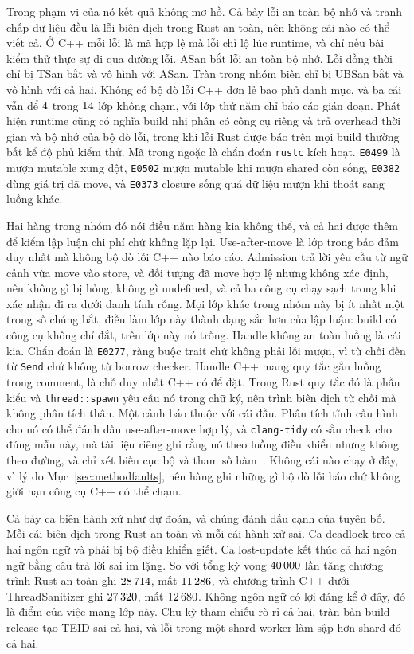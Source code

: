 Trong phạm vi của nó kết quả không mơ hồ. Cả bảy
lỗi an toàn bộ nhớ và tranh chấp dữ liệu đều là lỗi biên dịch trong Rust an toàn, nên không cái nào có thể
viết cả. Ở C++ mỗi lỗi là mã hợp lệ mà lỗi chỉ lộ lúc runtime, và
chỉ nếu bài kiểm thử thực sự đi qua đường lỗi. ASan bắt lỗi an toàn bộ nhớ. Lỗi
đồng thời chỉ bị TSan bắt và vô hình với ASan. Tràn trong
nhóm biên chỉ bị UBSan bắt và vô hình với cả hai. Không có bộ dò lỗi C++ đơn lẻ bao phủ
danh mục, và ba cái vẫn để $4$ trong
$14$ lớp không chạm, với lớp thứ năm chỉ báo cáo gián đoạn.
Phát hiện runtime cũng có nghĩa build nhị phân có công cụ riêng và trả overhead thời gian và bộ nhớ của bộ dò lỗi, trong khi
lỗi Rust được báo trên mọi build thường bất kể độ phủ kiểm thử. Mã
trong ngoặc là chẩn đoán \texttt{rustc} kích hoạt. \texttt{E0499} là mượn mutable
xung đột, \texttt{E0502} mượn mutable khi mượn shared còn sống, \texttt{E0382} dùng giá trị
đã move, và \texttt{E0373} closure sống quá dữ liệu mượn khi thoát sang luồng
khác.

Hai hàng trong nhóm đó nói điều năm hàng kia không thể, và cả hai được thêm để kiểm
lập luận chi phí chứ không lặp lại. Use-after-move là lớp trong bảo đảm duy nhất mà
không bộ dò lỗi C++ nào báo cáo. Admission trả lời yêu cầu từ ngữ cảnh vừa move
vào store, và đối tượng đã move hợp lệ nhưng không xác định, nên không gì bị hỏng,
không gì undefined, và cả ba công cụ chạy sạch trong khi xác nhận đi ra dưới
danh tính rỗng. Mọi lớp khác trong nhóm này bị ít nhất một trong số chúng bắt, điều
làm lớp này thành dạng sắc hơn của lập luận: build có công cụ không chỉ
đắt, trên lớp này nó trống. Handle không an toàn luồng là cái kia. Chẩn đoán là
\texttt{E0277}, ràng buộc trait chứ không phải lỗi mượn, vì từ chối đến từ
\texttt{Send} chứ không từ borrow checker. Handle C++ mang quy tắc gắn luồng
trong comment, là chỗ duy nhất C++ có để đặt. Trong Rust quy tắc đó là phần
kiểu và \texttt{thread::spawn} yêu cầu nó trong chữ ký, nên trình biên dịch từ chối mà không
phân tích thân. Một cảnh báo thuộc với cái đầu. Phân tích tĩnh
cấu hình cho nó có thể đánh dấu use-after-move hợp lý, và \texttt{clang-tidy} có sẵn check
cho đúng mẫu này, mà tài liệu riêng ghi rằng nó theo luồng điều khiển nhưng không theo
đường, và chỉ xét biến cục bộ và tham số
hàm~\cite{clangtidyuseaftermove}. Không cái nào chạy ở đây, vì lý do Mục~\ref{sec:methodfaults},
nên hàng ghi những gì bộ dò lỗi báo chứ không giới hạn công cụ C++ có thể chạm.

Cả bảy ca biên hành xử như dự đoán, và chúng đánh dấu cạnh của tuyên bố. Mỗi cái
biên dịch trong Rust an toàn và mỗi cái hành xử sai. Ca deadlock treo cả hai ngôn ngữ và phải bị
bộ điều khiển giết. Ca lost-update kết thúc cả hai ngôn ngữ bằng câu trả lời
sai im lặng. So với tổng kỳ vọng $40\,000$ lần tăng chương trình Rust an toàn
ghi $28\,714$, mất $11\,286$, và chương trình C++ dưới
ThreadSanitizer ghi $27\,320$, mất $12\,680$. Không ngôn ngữ
có lợi đáng kể ở đây, đó là điểm của việc mang lớp này. Chu kỳ tham chiếu
rò rỉ cả hai, tràn bản build release tạo
TEID sai cả hai, và lỗi trong một shard worker làm sập hơn shard đó
cả hai.

